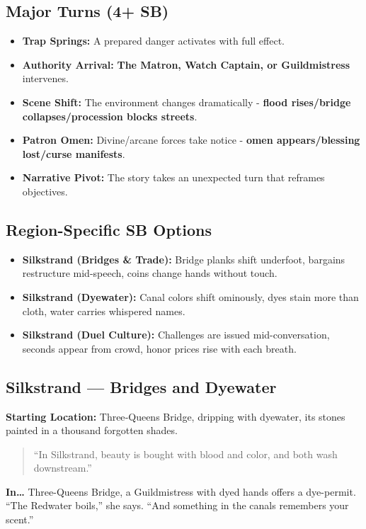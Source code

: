 \subsection*{Major Turns (4+ SB)}
\begin{itemize}
\item \textbf{Trap Springs:} A prepared danger activates with full effect.
\item \textbf{Authority Arrival:} \textbf{The Matron, Watch Captain, or Guildmistress} intervenes.
\item \textbf{Scene Shift:} The environment changes dramatically - \textbf{flood rises/bridge collapses/procession blocks streets}.
\item \textbf{Patron Omen:} Divine/arcane forces take notice - \textbf{omen appears/blessing lost/curse manifests}.
\item \textbf{Narrative Pivot:} The story takes an unexpected turn that reframes objectives.
\end{itemize}

\subsection*{Region-Specific SB Options}
\begin{itemize}
\item \textbf{Silkstrand (Bridges \& Trade):} Bridge planks shift underfoot, bargains restructure mid-speech, coins change hands without touch.
\item \textbf{Silkstrand (Dyewater):} Canal colors shift ominously, dyes stain more than cloth, water carries whispered names.
\item \textbf{Silkstrand (Duel Culture):} Challenges are issued mid-conversation, seconds appear from crowd, honor prices rise with each breath.
\end{itemize}


\subsection*{Silkstrand — Bridges and Dyewater}
\textbf{Starting Location:} Three‑Queens Bridge, dripping with dyewater, its stones painted in a thousand forgotten shades.
\begin{quote}
“In Silkstrand, beauty is bought with blood and color, and both wash downstream.”
\end{quote}

\textbf{In…} Three-Queens Bridge, a Guildmistress with dyed hands offers a dye-permit. ``The Redwater boils,'' she says. ``And something in the canals remembers your scent.''
